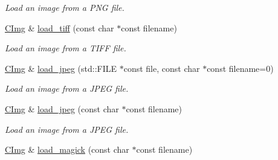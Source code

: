 \begin{DoxyCompactItemize}
\begin{DoxyCompactList}\small\item\em Load an image from a PNG file. \item\end{DoxyCompactList}\item 
\hypertarget{structcimg__library_1_1_c_img_a40ba0c2da622edd20d4925d97c923cf4}{
\hyperlink{structcimg__library_1_1_c_img}{CImg} \& \hyperlink{structcimg__library_1_1_c_img_a40ba0c2da622edd20d4925d97c923cf4}{load\_\-tiff} (const char $\ast$const filename)}
\label{structcimg__library_1_1_c_img_a40ba0c2da622edd20d4925d97c923cf4}

\begin{DoxyCompactList}\small\item\em Load an image from a TIFF file. \item\end{DoxyCompactList}\item 
\hypertarget{structcimg__library_1_1_c_img_a3532440be1bc9e5d560a8a4bc5bb8b98}{
\hyperlink{structcimg__library_1_1_c_img}{CImg} \& \hyperlink{structcimg__library_1_1_c_img_a3532440be1bc9e5d560a8a4bc5bb8b98}{load\_\-jpeg} (std::FILE $\ast$const file, const char $\ast$const filename=0)}
\label{structcimg__library_1_1_c_img_a3532440be1bc9e5d560a8a4bc5bb8b98}

\begin{DoxyCompactList}\small\item\em Load an image from a JPEG file. \item\end{DoxyCompactList}\item 
\hypertarget{structcimg__library_1_1_c_img_aace8a1932b7d3ad6216f1dbf23a310f9}{
\hyperlink{structcimg__library_1_1_c_img}{CImg} \& \hyperlink{structcimg__library_1_1_c_img_aace8a1932b7d3ad6216f1dbf23a310f9}{load\_\-jpeg} (const char $\ast$const filename)}
\label{structcimg__library_1_1_c_img_aace8a1932b7d3ad6216f1dbf23a310f9}

\begin{DoxyCompactList}\small\item\em Load an image from a JPEG file. \item\end{DoxyCompactList}\item 
\hypertarget{structcimg__library_1_1_c_img_ad0b95dce78785d8bdd436eaf482356d0}{
\hyperlink{structcimg__library_1_1_c_img}{CImg} \& \hyperlink{structcimg__library_1_1_c_img_ad0b95dce78785d8bdd436eaf482356d0}{load\_\-magick} (const char $\ast$const filename)}
\label{structcimg__library_1_1_c_img_ad0b95dce78785d8bdd436eaf482356d0}


\end{DoxyCompactItemize}
